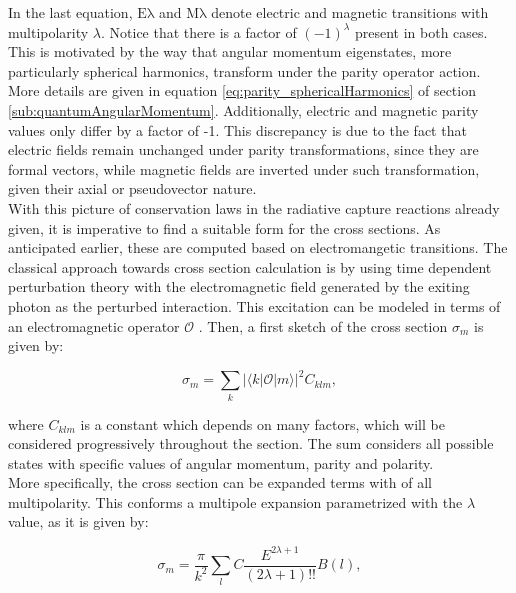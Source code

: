 \documentclass[openany]{book}
\begin{document}
In the last equation, $\mathrm{E\lambda}$ and $\mathrm{M\lambda}$ denote electric and magnetic transitions with multipolarity $\lambda$.  Notice that there is a factor of $(-1)^\lambda$ present in both cases. This is motivated by the way that angular momentum eigenstates, more particularly spherical harmonics, transform under the parity operator action. More details are given in equation \ref{eq:parity_sphericalHarmonics} of section \ref{sub:quantumAngularMomentum}. Additionally, electric and magnetic parity values only differ by a factor of -1. This discrepancy is due to the fact that electric fields remain unchanged under parity transformations, since they are formal vectors, while magnetic fields are inverted under such transformation, given their axial or pseudovector nature.   \\

With this picture of conservation laws in the radiative capture reactions already given, it is imperative to find a suitable form for the cross sections. As anticipated earlier, these are computed based on electromangetic transitions. The classical approach towards cross section calculation is by using time dependent perturbation theory with the electromagnetic field generated by the exiting photon as the perturbed interaction. This excitation can be modeled in terms of an electromagnetic operator $\mathcal{O}$ \cite{huang_bertulani_guimaraes_2010}. Then, a first sketch of the cross section $\sigma_m$ is given by: 

\begin{equation}  \label{eq:radiativeCapture_crossSection}
	\sigma_m = \sum_{k}{|\langle k | \mathcal{O} | m \rangle|^2} C_{klm},		
\end{equation}

where $C_{klm}$ is a constant which depends on many factors, which will be considered progressively throughout the section. The sum considers all possible states with specific values of angular momentum, parity and polarity. \\

More specifically, the cross section can be expanded terms with of all multipolarity. This conforms a multipole expansion  parametrized with the $\lambda$ value, as it is given by: 

\begin{equation}  \label{eq:radiativeCapture_crossSection_l}
	\sigma_m = \frac{\pi}{k^2} \sum_{l} C \frac{E^{2\lambda +1}}{(2\lambda+1)!!} B(l), 		
\end{equation}
\end{document}
